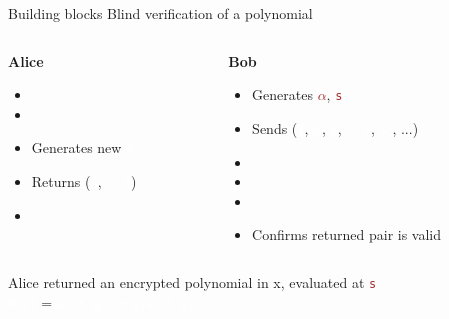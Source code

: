 \documentclass[dvipsnames]{beamer}
\newcommand{\priv}[1]{\textcolor{brown}{\texttt{#1}}}
\newcommand{\enc}[1]{\colorbox{SkyBlue!75}{\textcolor{white}{\texttt{#1}}}}
\begin{document}
    \begin{frame}{Building blocks}
        Blind verification of a polynomial
        \vspace{0.5cm}

        \begin{columns}
            \begin{column}{0.4\textwidth}
                \textbf{Alice}
                \begin{itemize}
                    \item[]
                    \item[]
                    \item Generates new \enc{X}
                    \item Returns (\enc{X}, \enc{$\alpha \cdot$X})
                    \item[]
                \end{itemize}
            \end{column}
            \begin{column}{0.6\textwidth}
                \textbf{Bob}
                \begin{itemize}
                    \item Generates \priv{$\alpha$}, \priv{s}
                    \item Sends (\enc{1}, \enc{$\alpha$}, \enc{s}, \enc{$\alpha \cdot$s}, \enc{s$^2$}, ...)
                    \item[]
                    \item[]
                    \item[] \item Confirms returned pair is valid
                \end{itemize}
            \end{column}
        \end{columns}
        \begin{center}
            Alice returned an encrypted polynomial in x, evaluated at \priv{s}\\
            \enc{H(s)} = \enc{a$_0$ + a$_1$s + a$_2$s$^2$ + a$_3$s$^3$}
        \end{center}
    \end{frame}
\end{document}
